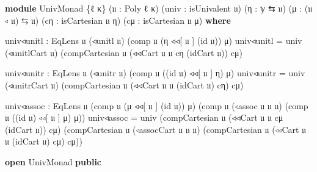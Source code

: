 \documentclass[
  11pt,
  oneside,
  article]{memoir}
\newenvironment{Shaded}{}{}
\newcommand{\KeywordTok}[1]{\textcolor[rgb]{0.00,0.44,0.13}{\textbf{#1}}}
\newcommand{\NormalTok}[1]{#1}
\newcommand{\OtherTok}[1]{\textcolor[rgb]{0.00,0.44,0.13}{#1}}
\theoremstyle{definition}
\theoremstyle{plain}
\newcommand{\0}{\textsf{0}}
\newcommand{\1}{\tn{\textsf{1}}}
\begin{document}
\begin{Shaded}
\begin{Highlighting}[]
\KeywordTok{module}\NormalTok{ UnivMonad }\OtherTok{\{}\NormalTok{ℓ κ}\OtherTok{\}} \OtherTok{(}\NormalTok{𝔲 }\OtherTok{:}\NormalTok{ Poly ℓ κ}\OtherTok{)} \OtherTok{(}\NormalTok{univ }\OtherTok{:}\NormalTok{ isUnivalent 𝔲}\OtherTok{)}
                 \OtherTok{(}\NormalTok{η }\OtherTok{:}\NormalTok{ 𝕪 ⇆ 𝔲}\OtherTok{)} \OtherTok{(}\NormalTok{μ }\OtherTok{:} \OtherTok{(}\NormalTok{𝔲 ◃ 𝔲}\OtherTok{)}\NormalTok{ ⇆ 𝔲}\OtherTok{)}
                 \OtherTok{(}\NormalTok{cη }\OtherTok{:}\NormalTok{ isCartesian 𝔲 η}\OtherTok{)} \OtherTok{(}\NormalTok{cμ }\OtherTok{:}\NormalTok{ isCartesian 𝔲 μ}\OtherTok{)} \KeywordTok{where}

\NormalTok{    univ◃unitl }\OtherTok{:}\NormalTok{ EqLens 𝔲 }\OtherTok{(}\NormalTok{◃unitl 𝔲}\OtherTok{)} \OtherTok{(}\NormalTok{comp 𝔲 }\OtherTok{(}\NormalTok{η ◃◃[ 𝔲 ] }\OtherTok{(}\NormalTok{id 𝔲}\OtherTok{))}\NormalTok{ μ}\OtherTok{)}
\NormalTok{    univ◃unitl }\OtherTok{=}\NormalTok{ univ }\OtherTok{(}\NormalTok{◃unitlCart 𝔲}\OtherTok{)} 
                      \OtherTok{(}\NormalTok{compCartesian 𝔲 }\OtherTok{(}\NormalTok{◃◃Cart 𝔲 𝔲 cη }\OtherTok{(}\NormalTok{idCart 𝔲}\OtherTok{))}\NormalTok{ cμ}\OtherTok{)}

\NormalTok{    univ◃unitr }\OtherTok{:}\NormalTok{ EqLens 𝔲 }\OtherTok{(}\NormalTok{◃unitr 𝔲}\OtherTok{)} \OtherTok{(}\NormalTok{comp 𝔲 }\OtherTok{((}\NormalTok{id 𝔲}\OtherTok{)}\NormalTok{ ◃◃[ 𝔲 ] η}\OtherTok{)}\NormalTok{ μ}\OtherTok{)}
\NormalTok{    univ◃unitr }\OtherTok{=}\NormalTok{ univ }\OtherTok{(}\NormalTok{◃unitrCart 𝔲}\OtherTok{)} 
                      \OtherTok{(}\NormalTok{compCartesian 𝔲 }\OtherTok{(}\NormalTok{◃◃Cart 𝔲 𝔲 }\OtherTok{(}\NormalTok{idCart 𝔲}\OtherTok{)}\NormalTok{ cη}\OtherTok{)}\NormalTok{ cμ}\OtherTok{)}


\NormalTok{    univ◃assoc }\OtherTok{:}\NormalTok{ EqLens 𝔲 }\OtherTok{(}\NormalTok{comp 𝔲 }\OtherTok{(}\NormalTok{μ ◃◃[ 𝔲 ] }\OtherTok{(}\NormalTok{id 𝔲}\OtherTok{))}\NormalTok{ μ}\OtherTok{)}
                          \OtherTok{(}\NormalTok{comp 𝔲 }\OtherTok{(}\NormalTok{◃assoc 𝔲 𝔲 𝔲}\OtherTok{)}
                                  \OtherTok{(}\NormalTok{comp 𝔲 }\OtherTok{((}\NormalTok{id 𝔲}\OtherTok{)}\NormalTok{ ◃◃[ 𝔲 ] μ}\OtherTok{)}\NormalTok{ μ}\OtherTok{))}
\NormalTok{    univ◃assoc }\OtherTok{=}\NormalTok{ univ }\OtherTok{(}\NormalTok{compCartesian 𝔲 }\OtherTok{(}\NormalTok{◃◃Cart 𝔲 𝔲 cμ }\OtherTok{(}\NormalTok{idCart 𝔲}\OtherTok{))}\NormalTok{ cμ}\OtherTok{)}
                      \OtherTok{(}\NormalTok{compCartesian 𝔲 }\OtherTok{(}\NormalTok{◃assocCart 𝔲 𝔲 𝔲}\OtherTok{)}
                                       \OtherTok{(}\NormalTok{compCartesian 𝔲 }
                                         \OtherTok{(}\NormalTok{◃◃Cart 𝔲 𝔲 }\OtherTok{(}\NormalTok{idCart 𝔲}\OtherTok{)}\NormalTok{ cμ}\OtherTok{)}\NormalTok{ cμ}\OtherTok{))}

\KeywordTok{open}\NormalTok{ UnivMonad }\KeywordTok{public}
\end{Highlighting}
\end{Shaded}
\end{document}
